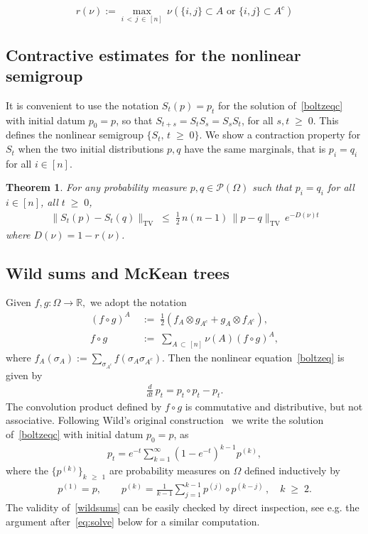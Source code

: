 \documentclass[10pt,a4paper]{article}
\newtheorem{theorem}{Theorem}[section]
\renewcommand{\leq}{\;\leqslant\;}
\renewcommand{\geq}{\;\geqslant\;}
\newcommand{\Om}{\Omega}
\newcommand{\si}{\sigma}
\newcommand{\tv}{\mathrm{TV}}
\newcommand{\cP}{\mathcal{P}}
\newcommand{\bbR}{\mathbb{R}}
\let\O=\Omega
\begin{document}
\begin{equation}\label{def:rnu}
r(\nu):= \max_{i\,<\,j\,\in\,[n]}\,\nu\left(\{i,j\}\subset A \text{ or }\{i,j\}\subset A^c\right)
\end{equation}

\subsection{Contractive estimates for the nonlinear semigroup}

It is convenient to use the notation $S_t(p)=p_t$ for the solution of~\eqref{boltzeqc} with initial datum $p_0=p$, so that $S_{t+s}=S_tS_s=S_sS_t$, for all $s,t\geq 0$. This defines the nonlinear semigroup $\{S_t, \,t\geq 0\}$. We show a contraction property for $S_t$ when the two initial distributions $p,q$ have the same marginals, that is $p_i=q_i$ for all $i \in [n]$.

\begin{theorem}\label{contrlemma2}
For any probability measure $p,q \in \cP(\O)$ such that $p_{i} = q_{i}$ for all $i \in [n]$, all $t\geq 0$,
\begin{align}\label{nonlincont1}
\|S_t(p)-S_t(q)\|_\tv \leq \tfrac12\,n(n-1)\,\|p-q\|_\tv \,e^{-D(\nu) t}
\end{align}
where $D(\nu)=1-r(\nu)$.
\end{theorem}

\subsection{Wild sums and McKean trees}

Given $f, g : \Om \rightarrow \bbR,$ we adopt the notation
\begin{align}
(f \circ g)^{A}\; &{:=}\; \frac{1}{2}\left(f_A \otimes g_{A^c}+ g_A \otimes f_{A^c} \right),\label{defconv1}\\
f \circ g \;&{:=}\; \sum_{A\,\subset\,[n]}\nu(A)(f \circ g)^{A},\label{defconv2}
\end{align}
where $f_A(\si_{A}) := \sum_{\si_{A^c}}f(\si_A\si_{A^c})$. Then the nonlinear equation~\eqref{boltzeq} is given by
\begin{align}\label{boltzeqc}
\frac{d}{dt}\,p_t = p_t\circ p_t - p_t.
\end{align}
The convolution product defined by $f\circ g$ is commutative and distributive, but not associative. Following Wild's original construction~\cite{Wild} we write the solution of~\eqref{boltzeqc} with initial datum $p_0=p$, as
\begin{align}\label{wildsums}
p_t = e^{-t}\sum_{k=1}^{\infty}\left(1-e^{-t}\right)^{k-1}p^{(k)},
\end{align}
where the $\{p^{(k)}\}_{k\,\geq\,1}$ are probability measures on $\Om$ defined inductively by
\begin{align}\label{eq:wildp}
p^{(1)}=p, \qquad p^{(k)} = \frac{1}{k-1}\sum_{j=1}^{k-1}p^{(j)}\circ p^{(k-j)}\,,\quad k\geq 2.
\end{align}
The validity of~\eqref{wildsums} can be easily checked by direct inspection, see e.g. the argument after~\eqref{eq:solve} below for a similar computation.
\end{document}

